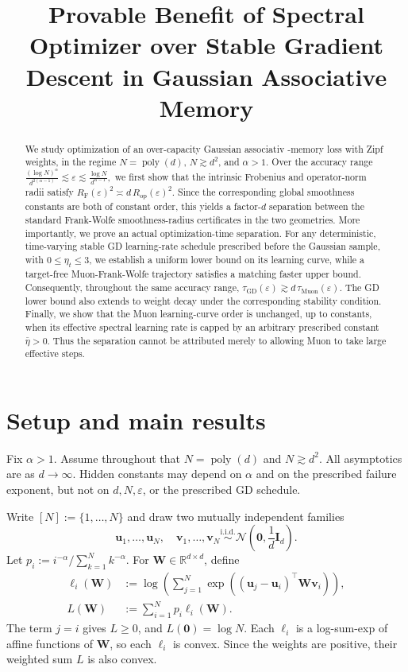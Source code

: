 \documentclass[11pt]{article}
\title{Provable Benefit of Spectral Optimizer over Stable Gradient Descent in Gaussian Associative Memory}
\date{}
\theoremstyle{definition}
\newcommand{\ub}{\mathbf{u}}
\newcommand{\vb}{\mathbf{v}}
\newcommand{\Ib}{\mathbf{I}}
\newcommand{\Wb}{\mathbf{W}}
\newcommand{\RR}{\mathbb{R}}
\newcommand{\eps}{\varepsilon}
\begin{document}
\maketitle

\begin{abstract}
We study optimization of an over-capacity Gaussian associativ -memory loss with Zipf weights, in the regime $N=\operatorname{poly}(d)$, $N\gtrsim d^2$, and $\alpha>1$. Over the accuracy range $\frac{(\log N)^\alpha}{d^{2(\alpha-1)}} \lesssim \varepsilon \lesssim \frac{\log N}{d^{\alpha-1}},$ we first show that the intrinsic Frobenius and operator-norm radii satisfy $R_{\mathrm F}(\varepsilon)^2\asymp d\,R_{\mathrm{op}}(\varepsilon)^2$. Since the corresponding global smoothness constants are both of constant order, this yields a factor-$d$ separation between the standard Frank-Wolfe smoothness-radius certificates in the two geometries. More importantly, we prove an actual optimization-time separation. For any deterministic, time-varying stable GD learning-rate schedule prescribed before the Gaussian sample, with $0\leq\eta_t\leq3$, we establish a uniform lower bound on its learning curve, while a target-free Muon-Frank-Wolfe trajectory satisfies a matching faster upper bound. Consequently, throughout the same accuracy range, $\tau_{\mathrm{GD}}(\varepsilon) \gtrsim d\,\tau_{\mathrm{Muon}}(\varepsilon).$ The GD lower bound also extends to weight decay under the corresponding stability condition. Finally, we show that the Muon learning-curve order is unchanged, up to constants, when its effective spectral learning rate is capped by an arbitrary prescribed constant $\bar\eta>0$. Thus the separation cannot be attributed merely to allowing Muon to take large effective steps.
\end{abstract}

\section{Setup and main results}

Fix $\alpha>1$.  Assume throughout that $N=\operatorname{poly}(d)$ and
$N\gtrsim d^2$.  All asymptotics are as $d\to\infty$.  Hidden constants
may depend on $\alpha$ and on the prescribed failure exponent, but not on
$d,N,\eps$, or the prescribed GD schedule.

Write $[N]:=\{1,\ldots,N\}$ and draw two mutually independent families
\[
 \ub_1,\ldots,\ub_N,
 \quad
 \vb_1,\ldots,\vb_N
 \overset{\mathrm{i.i.d.}}{\sim}
 \mathcal N\!\left(\mathbf 0,\frac1d\Ib_d\right).
\]
Let $p_i:=i^{-\alpha}/\sum_{k=1}^Nk^{-\alpha}$.  For
$\Wb\in\RR^{d\times d}$, define
\begin{align*}
 \ell_i(\Wb)
 &:={}
 \log\!\left(
  \sum_{j=1}^N
  \exp\!\left((\ub_j-\ub_i)^\top\Wb\vb_i\right)
 \right),\\
 L(\Wb)&:=\sum_{i=1}^Np_i\ell_i(\Wb).
\end{align*}
The term $j=i$ gives $L\geq0$, and $L(\mathbf 0)=\log N$.  Each $\ell_i$ is
a log-sum-exp of affine functions of $\Wb$, so each $\ell_i$ is convex.
Since the weights are positive, their weighted sum $L$ is also convex.
\end{document}
